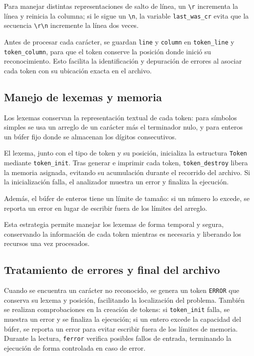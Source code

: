 \documentclass[12pt,letterpaper]{article}
\begin{document}
Para manejar distintas representaciones de salto de línea, un \texttt{\textbackslash r} incrementa la línea y reinicia la columna; si le sigue un \texttt{\textbackslash n}, la variable \texttt{last\_was\_cr} evita que la secuencia \texttt{\textbackslash r\textbackslash n} incremente la línea dos veces.

Antes de procesar cada carácter, se guardan \texttt{line} y \texttt{column} en \texttt{token\_line} y \texttt{token\_column}, para que el token conserve la posición donde inició su reconocimiento. Esto facilita la identificación y depuración de errores al asociar cada token con su ubicación exacta en el archivo.

\subsection*{Manejo de lexemas y memoria}
Los lexemas conservan la representación textual de cada token: para símbolos simples se usa un arreglo de un carácter más el terminador nulo, y para enteros un búfer fijo donde se almacenan los dígitos consecutivos.

El lexema, junto con el tipo de token y su posición, inicializa la estructura \texttt{Token} mediante \texttt{token\_init}. Tras generar e imprimir cada token, \texttt{token\_destroy} libera la memoria asignada, evitando su acumulación durante el recorrido del archivo. Si la inicialización falla, el analizador muestra un error y finaliza la ejecución.

Además, el búfer de enteros tiene un límite de tamaño: si un número lo excede, se reporta un error en lugar de escribir fuera de los límites del arreglo.

Esta estrategia permite manejar los lexemas de forma temporal y segura, conservando la información de cada token mientras es necesaria y liberando los recursos una vez procesados.

\subsection*{Tratamiento de errores y final del archivo}
Cuando se encuentra un carácter no reconocido, se genera un token \texttt{ERROR} que conserva su lexema y posición, facilitando la localización del problema. También se realizan comprobaciones en la creación de tokens: si \texttt{token\_init} falla, se muestra un error y se finaliza la ejecución; si un entero excede la capacidad del búfer, se reporta un error para evitar escribir fuera de los límites de memoria. Durante la lectura, \texttt{ferror} verifica posibles fallos de entrada, terminando la ejecución de forma controlada en caso de error.
\end{document}
